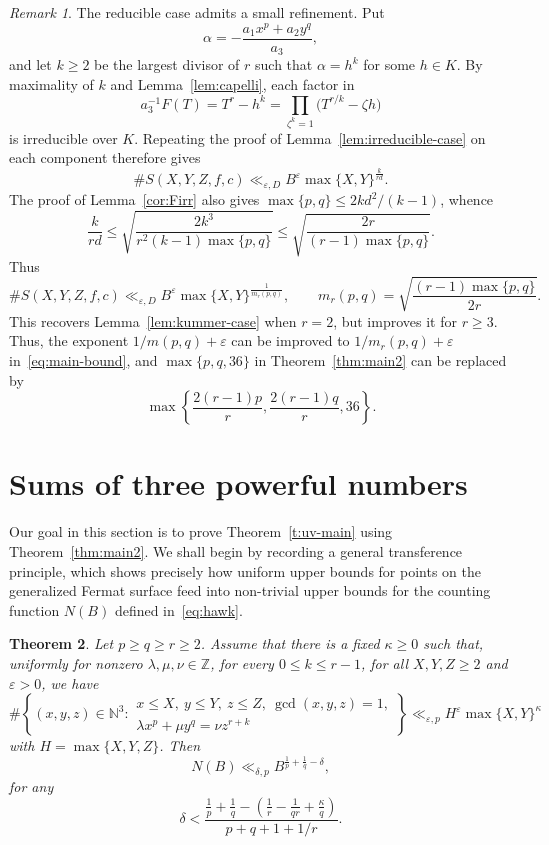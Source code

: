 \documentclass[a4paper,11pt,twoside,reqno]{amsart}
\newtheorem{theorem}{Theorem}[section]
\theoremstyle{definition}
\theoremstyle{remark}
\newtheorem{remark}[theorem]{Remark}
\numberwithin{equation}{section}
\newcommand\ve{\varepsilon}
\newcommand\1{\mathbf{1}}
\renewcommand{\leq}{\leqslant}
\renewcommand{\le}{\leqslant}
\renewcommand{\geq}{\geqslant}
\renewcommand{\ge}{\geqslant}
\begin{document}
\begin{remark}\label{rem:rem}
The reducible case admits a small refinement. Put
\[
\alpha=-\frac{a_1x^p+a_2y^q}{a_3},
\]
and let $k\geq2$ be the largest divisor of $r$ such that
$\alpha=h^k$ for some $h\in K$. By maximality of $k$ and
Lemma~\ref{lem:capelli}, each factor in
\[
a_3^{-1}F(T)
 =T^r-h^k
 =\prod_{\zeta^k=1}\bigl(T^{r/k}-\zeta h\bigr)
\]
is irreducible over $K$. Repeating the proof of
Lemma~\ref{lem:irreducible-case} on each component therefore gives
\[
\#S(X,Y,Z,f,c)
 \ll_{\ve,D}
 B^\ve\max\{X,Y\}^{\frac{k}{rd}}.
\]
The proof of Lemma~\ref{cor:Firr} also gives
$\max\{p,q\}\leq 2kd^2/(k-1)$,
whence
\[
\frac{k}{rd}
 \leq
 \sqrt{\frac{2k^3}{r^2(k-1)\max\{p,q\}}}
 \leq
 \sqrt{\frac{2r}{(r-1)\max\{p,q\}}}.
\]
Thus
\[
\#S(X,Y,Z,f,c)
 \ll_{\ve,D}
 B^\ve\max\{X,Y\}^{\frac{1}{m_r(p,q)}},
 \qquad
 m_r(p,q)=
 \sqrt{\frac{(r-1)\max\{p,q\}}{2r}}.
\]
This recovers Lemma~\ref{lem:kummer-case} when $r=2$, but improves it for  $r\geq3$. Thus, the exponent $1/m(p,q)+\ve$ can be improved to $1/m_r(p,q)+\ve$ in~\eqref{eq:main-bound}, and $\max\{p,q,36\}$ in Theorem~\ref{thm:main2} can be replaced by 
\[
\max\left\{\frac{2(r-1)p}{r},\frac{2(r-1)q}{r},36\right\}.
\]
\end{remark}

\section{Sums of three powerful numbers}

Our goal in this section is to prove Theorem~\ref{t:uv-main} using Theorem~\ref{thm:main2}. We shall begin by recording a general transference principle, which shows precisely how 
uniform upper bounds for points on the generalized Fermat surface feed into non-trivial upper bounds for 
the counting function $N(B)$ defined in~\eqref{eq:hawk}.

\begin{theorem}\label{prop:etagen}
Let $p\geq q\geq r\ge 2$. Assume that there is a fixed $\kappa\geq 0$ such that, uniformly for nonzero $\lambda,\mu,\nu\in\mathbb Z$, for every $0\le k\le r-1$, for all $X,Y,Z\geq 2$ and $\ve>0$, we have 
\[
\#\left\{(x,y,z)\in \mathbb N^3:
\begin{array}{l}
x\le X,\ y\le Y,\ z\le Z,\ \gcd(x,y,z)=1,\\
\lambda x^p+\mu y^q=\nu z^{r+k}
\end{array}
\right\}
\ll_{\varepsilon,p}
H^{\ve}\max\{X,Y\}^{\kappa}
\]
with $H=\max\{X,Y,Z\}$.
Then 
\[
N(B)\ll_{\delta, p}B^{\frac{1}{p}+\frac{1}{q}-\delta},
\]
for any 
\[
\delta<
 \frac{
 \displaystyle
 \frac1p+\frac1q-
 \left(
 \frac1r-\frac1{qr}+\frac{\kappa}q
 \right)}
 {p+q+1+1/r}.
\] 
\end{theorem}
\end{document}
